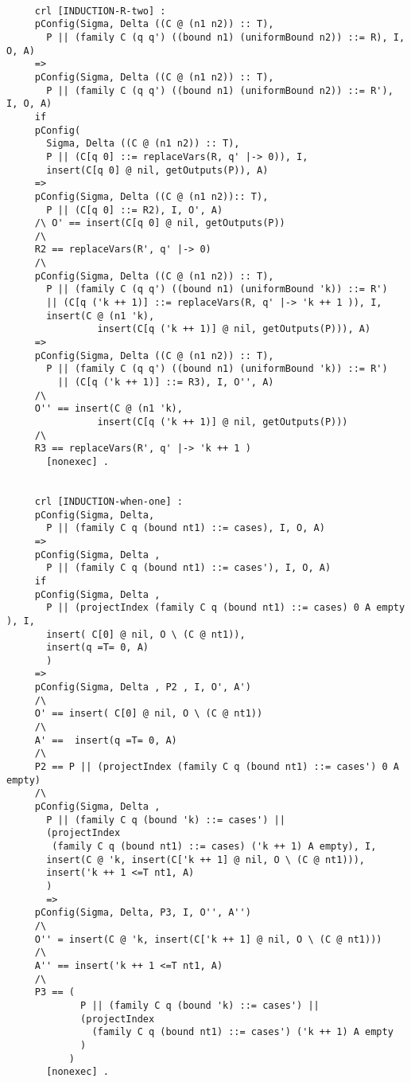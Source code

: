 \begin{lstlisting}
       
     crl [INDUCTION-R-two] :
     pConfig(Sigma, Delta ((C @ (n1 n2)) :: T), 
       P || (family C (q q') ((bound n1) (uniformBound n2)) ::= R), I, O, A)
     =>
     pConfig(Sigma, Delta ((C @ (n1 n2)) :: T), 
       P || (family C (q q') ((bound n1) (uniformBound n2)) ::= R'), I, O, A)
     if 
     pConfig(
       Sigma, Delta ((C @ (n1 n2)) :: T), 
       P || (C[q 0] ::= replaceVars(R, q' |-> 0)), I, 
       insert(C[q 0] @ nil, getOutputs(P)), A) 
     => 
     pConfig(Sigma, Delta ((C @ (n1 n2)):: T), 
       P || (C[q 0] ::= R2), I, O', A)
     /\ O' == insert(C[q 0] @ nil, getOutputs(P)) 
     /\
     R2 == replaceVars(R', q' |-> 0)
     /\
     pConfig(Sigma, Delta ((C @ (n1 n2)) :: T), 
       P || (family C (q q') ((bound n1) (uniformBound 'k)) ::= R') 
       || (C[q ('k ++ 1)] ::= replaceVars(R, q' |-> 'k ++ 1 )), I, 
       insert(C @ (n1 'k),  
                insert(C[q ('k ++ 1)] @ nil, getOutputs(P))), A) 
     =>
     pConfig(Sigma, Delta ((C @ (n1 n2)) :: T), 
       P || (family C (q q') ((bound n1) (uniformBound 'k)) ::= R')
         || (C[q ('k ++ 1)] ::= R3), I, O'', A) 
     /\
     O'' == insert(C @ (n1 'k),  
                insert(C[q ('k ++ 1)] @ nil, getOutputs(P)))
     /\
     R3 == replaceVars(R', q' |-> 'k ++ 1 )
       [nonexec] .  
  
       
     crl [INDUCTION-when-one] :
     pConfig(Sigma, Delta, 
       P || (family C q (bound nt1) ::= cases), I, O, A)
     =>
     pConfig(Sigma, Delta , 
       P || (family C q (bound nt1) ::= cases'), I, O, A)
     if 
     pConfig(Sigma, Delta , 
       P || (projectIndex (family C q (bound nt1) ::= cases) 0 A empty ), I, 
       insert( C[0] @ nil, O \ (C @ nt1)), 
       insert(q =T= 0, A)
       ) 
     => 
     pConfig(Sigma, Delta , P2 , I, O', A')
     /\
     O' == insert( C[0] @ nil, O \ (C @ nt1))
     /\
     A' ==  insert(q =T= 0, A) 
     /\
     P2 == P || (projectIndex (family C q (bound nt1) ::= cases') 0 A empty)
     /\
     pConfig(Sigma, Delta , 
       P || (family C q (bound 'k) ::= cases') || 
       (projectIndex 
        (family C q (bound nt1) ::= cases) ('k ++ 1) A empty), I, 
       insert(C @ 'k, insert(C['k ++ 1] @ nil, O \ (C @ nt1))), 
       insert('k ++ 1 <=T nt1, A)
       )
       =>
     pConfig(Sigma, Delta, P3, I, O'', A'')
     /\
     O'' = insert(C @ 'k, insert(C['k ++ 1] @ nil, O \ (C @ nt1)))
     /\
     A'' == insert('k ++ 1 <=T nt1, A) 
     /\
     P3 == (
             P || (family C q (bound 'k) ::= cases') ||
             (projectIndex 
               (family C q (bound nt1) ::= cases') ('k ++ 1) A empty
             )
           )
       [nonexec] . 
       

\end{lstlisting}
